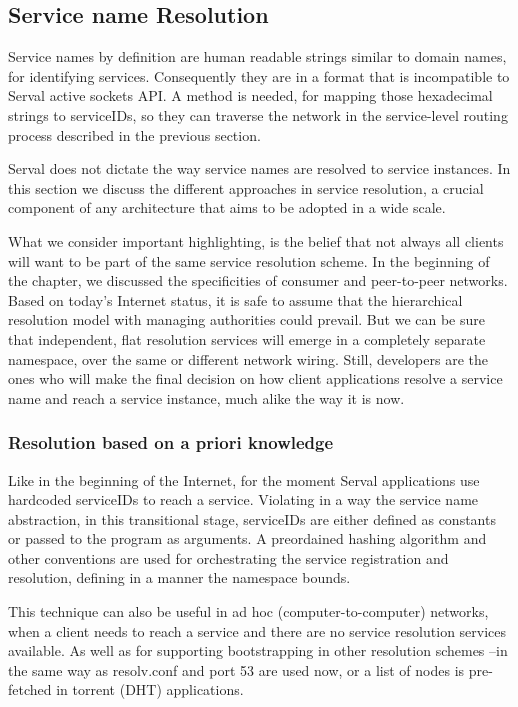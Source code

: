 \subsection{Service name Resolution}
Service names by definition are human readable strings similar to domain names, for identifying services.
Consequently they are in a format that is incompatible to Serval active sockets API.
A method is needed, for mapping those hexadecimal strings to serviceIDs, so they can traverse the network in the service-level routing process described in the previous section.

Serval does not dictate the way service names are resolved to service instances.
In this section we discuss the different approaches in service resolution, a crucial component of any architecture that aims to be adopted in a wide scale.

What we consider important highlighting, is the belief that not always all clients will want to be part of the same service resolution scheme.
In the beginning of the chapter, we discussed the specificities of consumer and peer-to-peer networks.
Based on today's Internet status, it is safe to assume that the hierarchical resolution model with managing authorities could prevail.
But we can be sure that independent, flat resolution services will emerge in a completely separate namespace, over the same or different network wiring.
Still, developers are the ones who will make the final decision on how client applications resolve a service name and reach a service instance, much alike the way it is now.



\subsubsection{Resolution based on a priori knowledge}
Like in the beginning of the Internet, for the moment Serval applications use hardcoded serviceIDs to reach a service.
Violating in a way the service name abstraction, in this transitional stage, serviceIDs are either defined as constants or passed to the program as arguments.
A preordained hashing algorithm and other conventions are used for orchestrating the service registration and resolution, defining in a manner the namespace bounds.

This technique can also be useful in ad hoc (computer-to-computer) networks, when a client needs to reach a service and there are no service resolution services available.
As well as for supporting bootstrapping in other resolution schemes --in the same way as resolv.conf and port 53 are used now, or a list of nodes is pre-fetched in torrent (DHT) applications.



